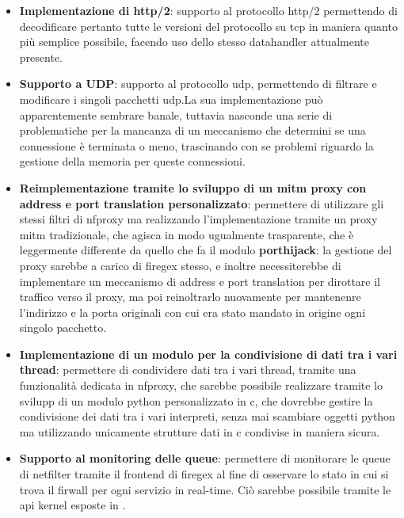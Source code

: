 \begin{itemize}
    \setlength{\itemsep}{2pt}
    \setlength{\parskip}{2pt}
    \item \textbf{Implementazione di \gls{http}/2}: supporto al protocollo \gls{http}/2 permettendo di decodificare pertanto tutte le versioni del protocollo su \gls{tcp} in maniera quanto più semplice possibile, facendo uso dello stesso datahandler attualmente presente.
    \item \textbf{Supporto a UDP}: supporto al protocollo \gls{udp}, permettendo di filtrare e modificare i singoli pacchetti \gls{udp}.\@ La sua implementazione può apparentemente sembrare banale, tuttavia nasconde una serie di problematiche per la mancanza di un meccanismo che determini se una connessione è terminata o meno, trascinando con se problemi riguardo la gestione della memoria per queste connessioni.
    \item \textbf{Reimplementazione tramite lo sviluppo di un \gls{mitm} proxy con address e port translation personalizzato}: permettere di utilizzare gli stessi filtri di \gls{nfproxy} ma realizzando l'implementazione tramite un proxy \gls{mitm} tradizionale, che agisca in modo ugualmente trasparente, che è leggermente differente da quello che fa il modulo \textbf{\gls{porthijack}}: la gestione del proxy sarebbe a carico di firegex stesso, e inoltre necessiterebbe di implementare un meccanismo di address e port translation per dirottare il traffico verso il proxy, ma poi reinoltrarlo nuovamente per mantenenre l'indirizzo e la porta originali con cui era stato mandato in origine ogni singolo pacchetto.
    \item \textbf{Implementazione di un modulo per la condivisione di dati tra i vari thread}: permettere di condividere dati tra i vari thread, tramite una funzionalità dedicata in \gls{nfproxy}, che sarebbe possibile realizzare tramite lo svilupp di un modulo python personalizzato in c, che dovrebbe gestire la condivisione dei dati tra i vari interpreti, senza mai scambiare oggetti python ma utilizzando unicamente strutture dati in c condivise in maniera sicura.
    \item \textbf{Supporto al monitoring delle queue}: permettere di monitorare le queue di netfilter tramite il frontend di firegex al fine di osservare lo stato in cui si trova il firwall per ogni servizio in real-time. Ciò sarebbe possibile tramite le \gls{api} kernel esposte in .
\end{itemize}
